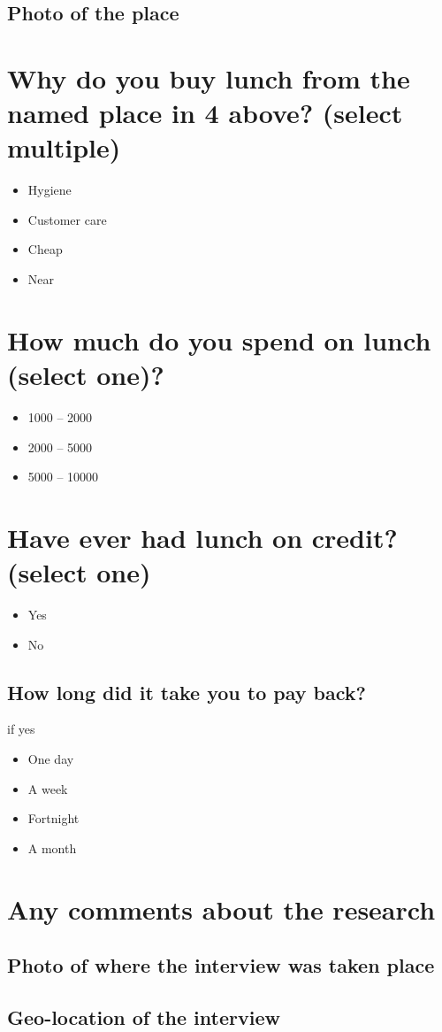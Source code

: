 \documentclass[12pt,a4paper]{article}
\begin{document}
\subsection{Photo of the place}



\section{Why do you buy lunch from the named place in 4 above? (select multiple)}
\begin{itemize}
\item Hygiene
\item Customer care
\item Cheap
\item Near
\end{itemize}
\section{How much do you spend on lunch (select one)?}

\begin{itemize}
\item 1000 – 2000
\item 2000 – 5000
\item 5000 – 10000
\end{itemize}
\section{Have ever had lunch on credit? (select one)}
\begin{itemize}
\item Yes
\item No
\end{itemize}

\subsection{How long did it take you to pay back?} if yes
\begin{itemize}
\item One day
\item A week
\item Fortnight
\item A month
\end{itemize}
\section{Any comments about the research}

\subsection{Photo of where the interview was taken place}

\subsection{Geo-location of the interview}
\end{document}
